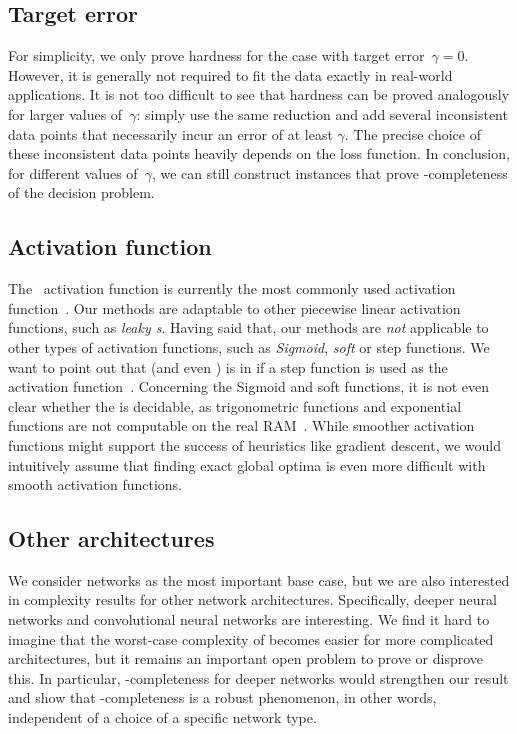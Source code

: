 \documentclass{toc}
\begin{document}
\subsection{Target error}
For simplicity, we only prove hardness for the case with target error~$\gamma = 0$.
However, it is generally not required to fit the data exactly in real-world applications.
It is not too difficult to see that hardness can be proved analogously for larger values of~$\gamma$: simply use the same reduction and add %
several  %
inconsistent data points that necessarily incur an error of at least $\gamma$.
The precise choice of these inconsistent data points heavily depends on the loss function.
In conclusion, for different values of~$\gamma$, we can still construct instances that prove \ER-completeness of the decision problem.

\subsection{Activation function}
The \ReLU~activation function is currently the most commonly used activation function~\cite{Arora2018_Understanding, Glorot2011_DeepSparse, Goodfellow2016_DeepLearning}.
%
%
%
Our methods are adaptable to other piecewise linear activation functions, such as 
\emph{leaky \ReLU{}s}.
Having said that, our methods are \emph{not} applicable to other types of activation functions, such as \emph{Sigmoid}, \emph{soft \ReLU} or step functions.
We want to point out that \trainNN (and even \ERM) is in \NP{} if a step function is used as the activation function~\cite{Khalife2023_Threshold}.
Concerning the Sigmoid and soft \ReLU %
functions,  %
it is not even clear whether the \ERM is decidable, as trigonometric functions and exponential functions are not computable on the real RAM~\cite{Erickson2022_SmoothingTheGap, Richardson1969_Undecidable}. %
While smoother activation functions might support the success of heuristics like gradient descent, we would intuitively assume that finding exact global optima is even more difficult with smooth activation functions.

\subsection{Other architectures}
We consider \fullyconnected \twolayer networks as the most important base case, but we are also interested in complexity results for other network architectures.
Specifically, deeper \fullyconnected neural networks and convolutional neural networks are interesting.
We find it hard to imagine that the worst-case complexity of \ERM becomes easier for more complicated architectures, but it remains an important open problem to prove or disprove this. In particular, \ER-completeness for deeper networks would strengthen our result and show that \ER-completeness is a robust phenomenon, in other words, independent of a choice of a specific network type.
\end{document}
